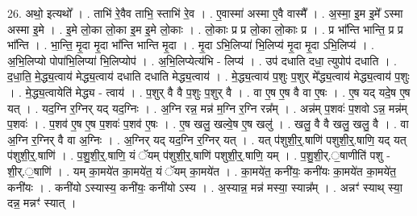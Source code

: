 \documentclass[17pt]{extarticle}
\begin{document}
26. अथो॒ इत्यथो᳚ । . ताभि॑ रे॒वैव ताभि॒ स्ताभि॑ रे॒व । . ए॒वास्मा॑ अस्मा ए॒वै वास्मै᳚ । . अ॒स्मा॒ इ॒म इ॒मे᳚ ऽस्मा अस्मा इ॒मे । . इ॒मे लो॒का लो॒का इ॒म इ॒मे लो॒काः । . लो॒काः प्र प्र लो॒का लो॒काः प्र । . प्र भा᳚न्ति भान्ति॒ प्र प्र भा᳚न्ति । . भा॒न्ति॒ मृ॒दा मृ॒दा भा᳚न्ति भान्ति मृ॒दा । . मृ॒दा ऽभि॒लिप्या॑ भि॒लिप्य॑ मृ॒दा मृ॒दा ऽभि॒लिप्य॑ । . अ॒भि॒लिप्यो पोपा॑भि॒लिप्या॑ भि॒लिप्योप॑ । . अ॒भि॒लिप्येत्य॑भि - लिप्य॑ । . उप॑ दधाति दधा॒ त्युपोप॑ दधाति । . द॒धा॒ति॒ मे॒द्ध्य॒त्वाय॑ मेद्ध्य॒त्वाय॑ दधाति दधाति मेद्ध्य॒त्वाय॑ । . मे॒द्ध्य॒त्वाय॑ प॒शुः प॒शुर् मे᳚द्ध्य॒त्वाय॑ मेद्ध्य॒त्वाय॑ प॒शुः । . मे॒द्ध्य॒त्वायेति॑ मेद्ध्य - त्वाय॑ । . प॒शुर् वै वै प॒शुः प॒शुर् वै । . वा ए॒ष ए॒ष वै वा ए॒षः । . ए॒ष यद् यदे॒ष ए॒ष यत् । . यद॒ग्नि र॒ग्निर् यद् यद॒ग्निः । . अ॒ग्नि रन्न॒ मन्न॑ म॒ग्नि र॒ग्नि रन्न᳚म् । . अन्न॑म् प॒शवः॑ प॒शवो ऽन्न॒ मन्न॑म् प॒शवः॑ । . प॒शव॑ ए॒ष ए॒ष प॒शवः॑ प॒शव॑ ए॒षः । . ए॒ष खलु॒ खल्वे॒ष ए॒ष खलु॑ । . खलु॒ वै वै खलु॒ खलु॒ वै । . वा अ॒ग्नि र॒ग्निर् वै वा अ॒ग्निः । . अ॒ग्निर् यद् यद॒ग्नि र॒ग्निर् यत् । . यत् प॑शुशी॒र्॒.षाणि॑ पशुशी॒र्॒.षाणि॒ यद् यत् प॑शुशी॒र्॒.षाणि॑ । . प॒शु॒शी॒र्॒.षाणि॒ यं ॅयम् प॑शुशी॒र्॒.षाणि॑ पशुशी॒र्॒.षाणि॒ यम् । . प॒शु॒शी॒र्.॒षाणीति॑ पशु - शी॒र्.॒षाणि॑ । . यम् का॒मये॑त का॒मये॑त॒ यं ॅयम् का॒मये॑त । . का॒मये॑त॒ कनी॑यः॒ कनी॑यः का॒मये॑त का॒मये॑त॒ कनी॑यः । . कनी॑यो ऽस्यास्य॒ कनी॑यः॒ कनी॑यो ऽस्य । . अ॒स्यान्न॒ मन्न॑ मस्या॒ स्यान्न᳚म् । . अन्नꣳ॑ स्याथ् स्या॒ दन्न॒ मन्नꣳ॑ स्यात् । \newline
\end{document}
